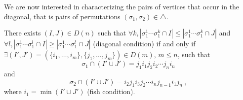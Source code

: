 We are now interested in characterizing the pairs of vertices that occur in the diagonal, that is pairs of permutations $(\sigma_1,\sigma_2) \in \triangle$. 

\begin{thm} There exists $(I,J) \in D(n)$ such that $\forall k, |\sigma_1^1\cdots\sigma_1^k \cap I| \leq |\sigma_1^1\cdots\sigma_1^k \cap J|$ and $\forall l, |\sigma_1^1\cdots\sigma_1^l \cap I| \geq |\sigma_1^1\cdots\sigma_1^l \cap J|$ (diagonal condition) if and only if $\exists (I',J')=(\{i_1,\ldots,i_m\},\{j_1,\ldots,j_m\}) \in D(m)$, $m\leq n$, such that \[\sigma_1 \cap (I'\cup J')=j_1 i_1 j_2 i_2 \cdots j_n i_n \] and \[ \sigma_2 \cap (I'\cup J') = i_2 j_1 i_3 j_2 \cdots i_n j_{n-1} i_1 j_n \ , \] where $i_1 = \min (I' \cup J')$ (fish condition). 
\end{thm}

